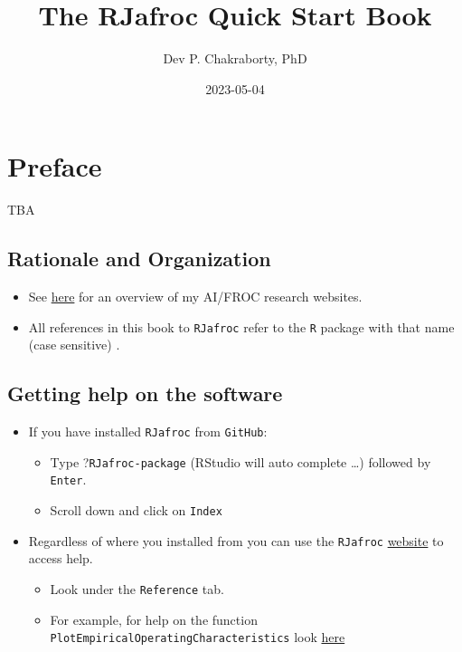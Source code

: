 \documentclass[
]{book}
\title{The RJafroc Quick Start Book}
\author{Dev P. Chakraborty, PhD}
\date{2023-05-04}
\providecommand{\tightlist}{%
  \setlength{\itemsep}{0pt}\setlength{\parskip}{0pt}}
\begin{document}
\maketitle

{
\setcounter{tocdepth}{1}
\tableofcontents
}
\hypertarget{quick-start-index-preface}{%
\chapter{Preface}\label{quick-start-index-preface}}

TBA

\hypertarget{quick-start-index-rationale-and-organization}{%
\section{Rationale and Organization}\label{quick-start-index-rationale-and-organization}}

\begin{itemize}
\tightlist
\item
  See \href{https://dpc10ster.github.io/ai-froc-research/}{here} for an overview of my AI/FROC research websites.
\item
  All references in this book to \texttt{RJafroc} refer to the \texttt{R} package with that name (case sensitive) \citep{R-RJafroc}.
\end{itemize}

\hypertarget{quick-start-index-getting-help}{%
\section{Getting help on the software}\label{quick-start-index-getting-help}}

\begin{itemize}
\tightlist
\item
  If you have installed \texttt{RJafroc} from \texttt{GitHub}:

  \begin{itemize}
  \tightlist
  \item
    Type ?\texttt{RJafroc-package} (RStudio will auto complete \ldots) followed by \texttt{Enter}.
  \item
    Scroll down and click on \texttt{Index}
  \end{itemize}
\item
  Regardless of where you installed from you can use the \texttt{RJafroc} \href{https://dpc10ster.github.io/RJafroc/}{website} to access help.

  \begin{itemize}
  \tightlist
  \item
    Look under the \texttt{Reference} tab.
  \item
    For example, for help on the function \texttt{PlotEmpiricalOperatingCharacteristics} look \href{https://dpc10ster.github.io/RJafroc/reference/PlotEmpiricalOperatingCharacteristics.html}{here}
  \end{itemize}
\end{itemize}
\end{document}
